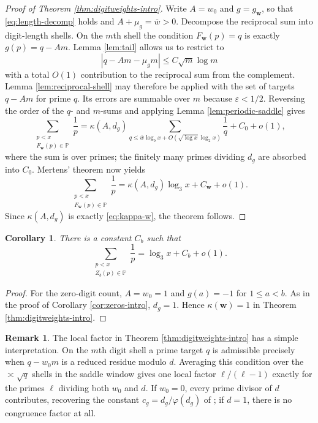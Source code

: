 \documentclass[11pt,reqno]{amsart}
\theoremstyle{plain}
\newtheorem{corollary}[theorem]{Corollary}
\theoremstyle{definition}
\newtheorem{remark}[theorem]{Remark}
\newcommand{\Pp}{\mathbb{P}}
\newcommand{\eps}{\varepsilon}
\newcommand{\1}{\mathbf 1}
\begin{document}
\begin{proof}[Proof of Theorem \ref{thm:digitweights-intro}]
Write $A=w_0$ and $g=g_{\mathbf w}$, so that \eqref{eq:length-decomp} holds and $A+\mu_g=\overline w>0$.  Decompose the reciprocal sum into digit-length shells.  On the $m$th shell the condition $F_{\mathbf w}(p)=q$ is exactly
$g(p)=q-Am$.
Lemma \ref{lem:tail} allows us to restrict to
\[
 |q-Am-\mu_gm|\le C\sqrt m\log m
\]
with a total $O(1)$ contribution to the reciprocal sum from the complement.  Lemma \ref{lem:reciprocal-shell} may therefore be applied with the set of targets $q-Am$ for prime $q$.  Its errors are summable over $m$ because $\eps<1/2$.  Reversing the order of the $q$- and $m$-sums and applying Lemma \ref{lem:periodic-saddle} gives
\[
 \sum_{\substack{p<x\\F_{\mathbf w}(p)\in\Pp}}\frac1p
 =\kappa(A,d_g)\sum_{q\le \overline w\log_bx+O(\sqrt{\log x}\log_2x)}\frac1q+C_0+o(1),
\]
where the sum is over primes; the finitely many primes dividing $d_g$ are absorbed into $C_0$.  Mertens' theorem now yields
\[
 \sum_{\substack{p<x\\F_{\mathbf w}(p)\in\Pp}}\frac1p
 =\kappa(A,d_g)\log_3x+C_{\mathbf w}+o(1).
\]
Since $\kappa(A,d_g)$ is exactly \eqref{eq:kappa-w}, the theorem follows.
\end{proof}

\begin{corollary}\label{cor:zero-mertens-intro}
There is a constant $C_b$ such that
\[
 \sum_{\substack{p<x\\ Z_b(p)\in\Pp}}\frac1p
 =\log_3x+C_b+o(1).
\]
\end{corollary}

\begin{proof}
For the zero-digit count, $A=w_0=1$ and $g(a)=-1$ for $1\le a<b$.  As in the proof of Corollary \ref{cor:zeros-intro}, $d_g=1$.  Hence $\kappa(\mathbf w)=1$ in Theorem \ref{thm:digitweights-intro}.
\end{proof}

\begin{remark}\label{rem:digitweight-factor}
The local factor in Theorem \ref{thm:digitweights-intro} has a simple interpretation.  On the $m$th digit shell a prime target $q$ is admissible precisely when $q-w_0m$ is a reduced residue modulo $d$.  Averaging this condition over the $\asymp\sqrt q$ shells in the saddle window gives one local factor $\ell/(\ell-1)$ exactly for the primes $\ell$ dividing both $w_0$ and $d$.  If $w_0=0$, every prime divisor of $d$ contributes, recovering the constant $c_g=d_g/\varphi(d_g)$ of \cite{vibefrtz}; if $d=1$, there is no congruence factor at all.
\end{remark}
\end{document}
